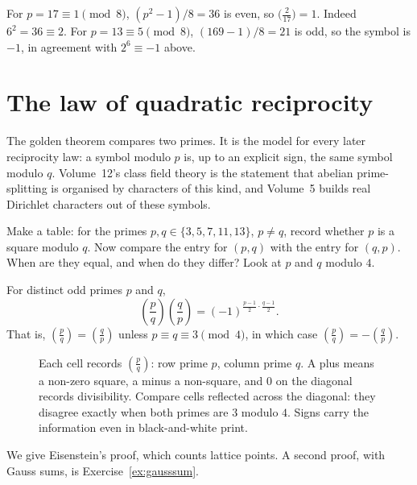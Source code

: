 \begin{examplex}[the supplementary law at $p=17$ and $p=13$]
For $p=17\equiv 1\pmod 8$, $(p^2-1)/8=36$ is even, so $\bigl(\frac{2}{17}\bigr)=1$. Indeed $6^2=36\equiv 2$.
For $p=13\equiv 5\pmod 8$, $(169-1)/8=21$ is odd, so the symbol is $-1$, in agreement with $2^6\equiv -1$ above.
\end{examplex}

\section{The law of quadratic reciprocity}

The golden theorem compares two primes. It is the model for every later reciprocity law: a symbol modulo $p$ is, up to an explicit sign, the same symbol modulo $q$. Volume~12's class field theory is the statement that abelian prime-splitting is organised by characters of this kind, and Volume~5 builds real Dirichlet characters out of these symbols.

\begin{think}
Make a table: for the primes $p,q\in\{3,5,7,11,13\}$, $p\ne q$, record whether $p$ is a square modulo $q$. Now compare the entry for $(p,q)$ with the entry for $(q,p)$. When are they equal, and when do they differ? Look at $p$ and $q$ modulo $4$.
\end{think}

\begin{theorem}\label{thm:qr}
For distinct odd primes $p$ and $q$,
\[
\left(\frac pq\right)\left(\frac qp\right)=(-1)^{\frac{p-1}2\cdot\frac{q-1}2}.
\]
That is, $\left(\frac pq\right)=\left(\frac qp\right)$ unless $p\equiv q\equiv3\pmod4$, in which case $\left(\frac pq\right)=-\left(\frac qp\right)$.
\end{theorem}

\begin{figure}[ht]
\centering
{}
\caption{Each cell records $\left(\frac pq\right)$: row prime $p$, column
prime $q$. A plus means a non-zero square, a minus a non-square, and $0$
on the diagonal records divisibility. Compare cells reflected across the
diagonal: they disagree exactly when both primes are $3$ modulo $4$.
Signs carry the information even in black-and-white print.}
\label{fig:reciprocitytable}
\end{figure}

We give Eisenstein's proof, which counts lattice points. A second proof, with Gauss sums, is Exercise~\ref{ex:gausssum}.

